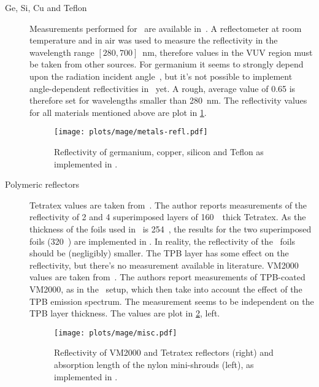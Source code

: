 \begin{description}
  \item[Ge, Si, Cu and Teflon] Measurements performed for \gerda\ are available
    in~\cite{Wegmann2017}.  A reflectometer at room temperature and in air was used to
    measure the reflectivity in the wavelength range $[280, 700]$~nm, therefore values in
    the VUV region must be taken from other sources. For germanium it seems to strongly
    depend upon the radiation incident angle~\cite{Marton1967}, but it's not possible to
    implement angle-dependent reflectivities in \geant\ yet. A rough, average value of
    0.65 is therefore set for wavelengths smaller than 280~nm. The reflectivity values for
    all materials mentioned above are plot in \cref{fig:bkg:lar:ph2:mage:metals-refl}.

    \begin{figure}
      \centering
      \texttt{[image: plots/mage/metals-refl.pdf]}
      \caption{%
        Reflectivity of germanium, copper, silicon and Teflon as implemented in \mage.
      }\label{fig:bkg:lar:ph2:mage:metals-refl}
    \end{figure}

  \item[Polymeric reflectors] Tetratex\reg{} values are taken from~\cite{Janecek2012}. The
    author reports measurements of the reflectivity of 2 and 4 superimposed layers of
    160~\mum\ thick Tetratex\reg{}. As the thickness of the foils used in \gerda\ is
    254~\mum, the results for the two superimposed foils (320~\mum) are implemented in
    \mage. In reality, the reflectivity of the \gerda\ foils should be (negligibly)
    smaller. The TPB layer has some effect on the reflectivity, but there's no measurement
    available in literature.  VM2000 values are taken from~\cite{Francini2013}.  The
    authors report measurements of TPB-coated VM2000, as in the \gerda\ setup, which then
    take into account the effect of the TPB emission spectrum. The measurement seems to be
    independent on the TPB layer thickness. The values are plot in
    \cref{fig:bkg:lar:ph2:mage:misc}, left.

    \begin{figure}
      \centering
      \texttt{[image: plots/mage/misc.pdf]}
      \caption{%
        Reflectivity of VM2000 and Tetratex\reg{} reflectors (right) and absorption length
        of the nylon mini-shrouds (left), as implemented in \mage.
      }\label{fig:bkg:lar:ph2:mage:misc}
    \end{figure}

\end{description}

